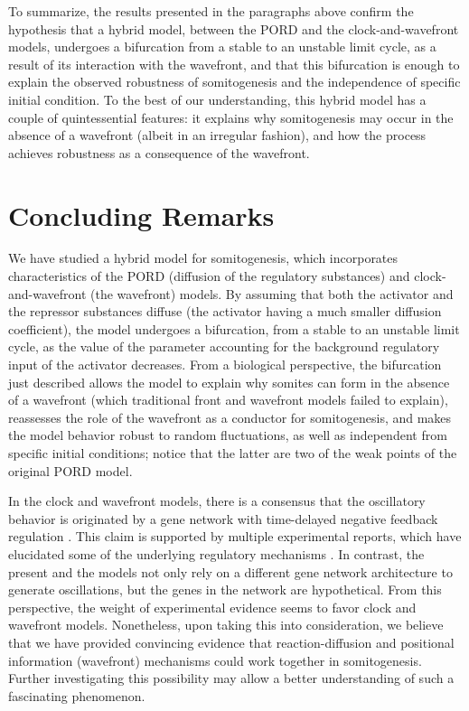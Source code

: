 \documentclass[%
 preprint,
 amsmath,amssymb,
 aps,
]{revtex4-2}
\begin{document}
	To summarize, the results presented in the paragraphs above confirm the
	hypothesis that a hybrid model, between the PORD and the clock-and-wavefront 
	models, undergoes a bifurcation from a stable to an 
	unstable limit cycle, as a result of its interaction with the
	wavefront, and
	that this bifurcation is enough to explain the observed robustness of
	somitogenesis and the independence of specific initial condition. 
	To the best of our understanding, this hybrid model has
	a couple of quintessential features: it explains why somitogenesis may occur in the 
	absence of a wavefront (albeit in an irregular fashion), and how the process 
	achieves robustness as a consequence of the wavefront.
	
	
	\section{Concluding Remarks}
	\label{conclu}
	
	We have studied a hybrid model for somitogenesis, which incorporates 
	characteristics of the PORD (diffusion of the regulatory substances) and 
	clock-and-wavefront (the wavefront) models. By assuming that both the activator 
	and the repressor substances diffuse (the activator having a much smaller 
	diffusion coefficient), the model undergoes a bifurcation, from a stable to an 
	unstable limit cycle, as the value of the parameter accounting for the background
	regulatory input of the activator decreases. From a biological perspective, the
	bifurcation just described allows the model to explain why somites can form in
	the absence of a wavefront (which traditional front and wavefront models failed
	to explain), reassesses the role of the wavefront as a conductor for
	somitogenesis, and makes the model behavior robust to random fluctuations, as 
	well as independent from specific initial conditions;
	notice that the latter are two of the weak points of the original PORD model.  
	
	In the clock and wavefront models, there is a consensus that the oscillatory
	behavior is originated by a gene network with time-delayed negative feedback
	regulation \citep{Monk2003, Lewis2003}. This claim is supported by multiple
	experimental reports, which have elucidated some of the underlying regulatory
	mechanisms \citep{Schroter2012}. In contrast, the present and the
	\citet{Cotterell2015} models not only rely on a different gene network
	architecture to generate oscillations, but the genes in the network are
	hypothetical. From this perspective, the weight of experimental evidence seems
	to favor clock and wavefront models. Nonetheless, upon taking this into
	consideration, we
	believe that we have provided convincing evidence that reaction-diffusion and
	positional information (wavefront) mechanisms could work together in
	somitogenesis. Further investigating this possibility may allow a better
	understanding of such a fascinating phenomenon.
	
\end{document}
